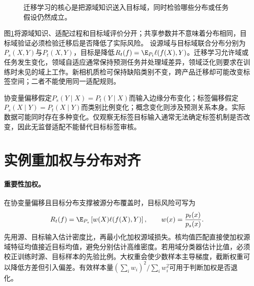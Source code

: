 \begin{figure}[htbp]
\centering
{}
\caption{迁移学习的核心是把源域知识送入目标域，同时检验哪些分布或任务假设仍然成立。}
\label{fig:transfer-source-target}
\end{figure}
图\ref{fig:transfer-source-target}将源域知识、适配过程和目标域评价分开；共享参数并不意味着分布相同，目标域验证必须检验迁移后是否降低了实际风险。
设源域与目标域联合分布分别为$P_s(X,Y)$与$P_t(X,Y)$，目标是降低$R_t(f)=\E_{P_t}\ell(f(X),Y)$。迁移学习允许域或任务发生变化，领域自适应通常保持预测任务并处理域差异，领域泛化则要求在训练时未见的域上工作\cite{pan2010transfer}。新相机质检可保持缺陷类别不变，跨产品迁移却可能改变标签空间；二者不能使用同一适配规则。

协变量偏移假定$P_s(Y\mid X)=P_t(Y\mid X)$而输入边缘分布变化；标签偏移假定$P_s(X\mid Y)=P_t(X\mid Y)$而类别比例变化；概念变化则涉及预测关系本身。实际数据可能同时存在多种变化。仅观察无标签目标输入通常无法确定标签机制是否改变，因此无监督适配不能替代目标标签审核。

\section{实例重加权与分布对齐}
\paragraph{重要性加权。}
在协变量偏移且目标分布支撑被源分布覆盖时，目标风险可写为
\begin{equation}
 R_t(f)=\E_{P_s}\left[w(X)\ell(f(X),Y)\right],\qquad
 w(x)=\frac{p_t(x)}{p_s(x)}.
\end{equation}
先用源、目标输入估计密度比，再最小化加权源域损失。核均值匹配直接使加权源域特征均值接近目标均值，避免分别估计高维密度\cite{huang2007kmm}。若用域分类器估计比值，必须校正训练时源、目标样本的先验比例。大权重会使少数样本主导梯度，截断权重可以降低方差但引入偏差。有效样本量$(\sum_iw_i)^2/\sum_iw_i^2$可用于判断加权是否退化。

